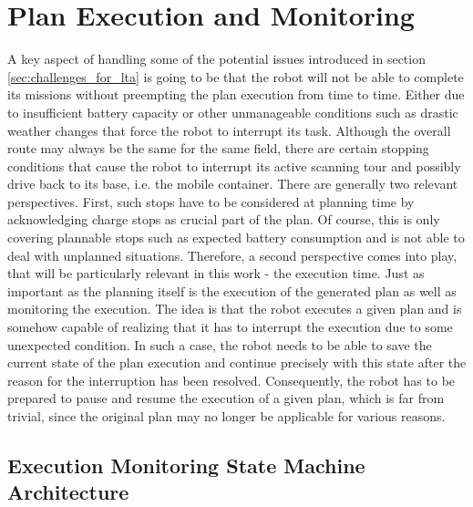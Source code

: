 \documentclass[english, master, utf8]{base/thesis_KBS}
\begin{document}
\pagebreak

\chapter{Plan Execution and Monitoring}

A key aspect of handling some of the potential issues introduced in section \ref{sec:challenges_for_lta} is going to be that the robot will not be able to
complete its missions without preempting the plan execution from time to time. Either due to insufficient battery capacity or other unmanageable conditions such as 
drastic weather changes that force the robot to interrupt its task. Although the overall route may always be the same for the same field, there are certain stopping
conditions that cause the robot to interrupt its active scanning tour and possibly drive back to its base, i.e. the mobile container.
There are generally two relevant perspectives. First, such stops have to be considered at planning time by acknowledging charge stops as crucial part of the plan.
Of course, this is only covering plannable stops such as expected battery consumption and is not able to deal with unplanned situations.
Therefore, a second perspective comes into play, that will be particularly relevant in this work - the execution time.
Just as important as the planning itself is the execution of the generated plan as well as monitoring the execution.
The idea is that the robot executes a given plan and is somehow capable of realizing that it has to interrupt the execution due to some unexpected condition.
In such a case, the robot needs to be able to save the current state of the plan execution and continue precisely with this state after the reason 
for the interruption has been resolved. Consequently, the robot has to be prepared to pause and resume the execution of a given plan, which is far from 
trivial, since the original plan may no longer be applicable for various reasons.

\section{Execution Monitoring State Machine Architecture}
\label{sec:execution_monitoring_smach_architecture}
\end{document}
